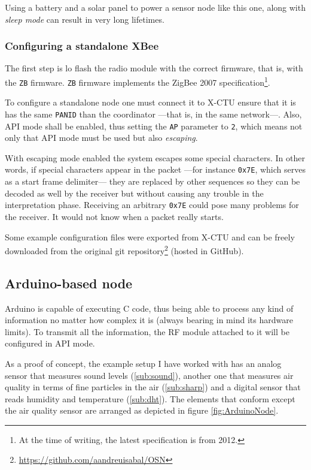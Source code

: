 Using a battery and a solar panel to power a sensor node like this one, along with \emph{sleep mode} can result in very long lifetimes.

\subsubsection{Configuring a standalone XBee\textregistered{}}
The first step is lo flash the radio module with the correct firmware, that is, with the \texttt{ZB} firmware. \texttt{ZB} firmware implements the ZigBee 2007 specification\footnote{At the time of writing, the latest specification is from 2012.}.

To configure a standalone node one must connect it to X-CTU ensure that it is has the same \texttt{PANID} than the coordinator ---that is, in the same network---. Also, API mode shall be enabled, thus setting the \texttt{AP} parameter to \texttt{2}, which means not only that API mode must be used but also \emph{escaping}.

With escaping mode enabled the system escapes some special characters. In other words, if special characters appear in the packet ---for instance \texttt{0x7E}, which serves as a start frame delimiter--- they are replaced by other sequences so they can be decoded as well by the receiver but without causing any trouble in the interpretation phase. Receiving an arbitrary \texttt{0x7E} could pose many problems for the receiver. It would not know when a packet really starts\citep{digi:escapedchars}.

Some example configuration files were exported from X-CTU and can be freely downloaded from the original git repository\footnote{\url{https://github.com/aandreuisabal/OSN}} (hosted in GitHub).

\subsection{Arduino-based node}

Arduino is capable of executing C code, thus being able to process any kind of information no matter how complex it is (always bearing in mind its hardware limits). To transmit all the information, the RF module attached to it will be configured in API mode.

As a proof of concept, the example setup I have worked with has an analog sensor that measures sound levels (\ref{sub:sound}), another one that measures air quality in terms of fine particles in the air (\ref{sub:sharp}) and a digital sensor that reads humidity and temperature (\ref{sub:dht}). The elements that conform except the air quality sensor are arranged as depicted in figure \ref{fig:ArduinoNode}.

